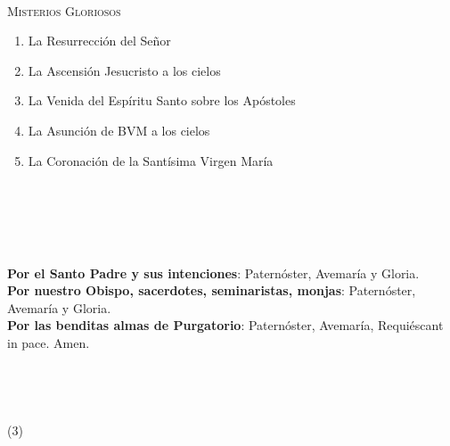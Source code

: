 \documentclass[9pt]{article}
\begin{document}
\begin{multicols*}{2}
    \vspace{2mm}

    \small{}\\
    \textsc{Misterios Gloriosos}
    \begin{enumerate}
        \item La Resurrección del Señor
        \item La Ascensión Jesucristo a los cielos
        \item La Venida del Espíritu Santo sobre los Apóstoles
        \item La Asunción de BVM a los cielos
        \item La Coronación de la Santísima Virgen María
    \end{enumerate}

    \vspace{2mm}

    \\[1mm]
    \\[1mm]
    \\[1mm]
    

    \vspace{2mm}

    \\

    \textbf{Por el Santo Padre y sus intenciones}: Paternóster, Avemaría y Gloria.\\[1mm]
    \textbf{Por nuestro Obispo, sacerdotes, seminaristas, monjas}: Paternóster, Avemaría y Gloria.\\[1mm]
    \textbf{Por las benditas almas de Purgatorio}: Paternóster, Avemaría, Requiéscant in pace. Amen.\\

    \\

    \\

    \\

    \\

    (3)\\[1mm]


\end{multicols*}
\end{document}
